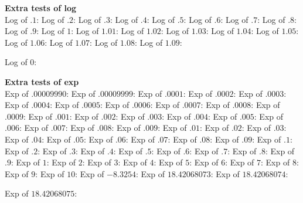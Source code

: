 \filbreak
{\bf Extra tests of log}\\
 Log of $.1$:\Z\w
 Log of $.2$:\Z\w
 Log of $.3$:\Z\w
 Log of $.4$:\Z\w
 Log of $.5$:\Z\w
 Log of $.6$:\Z\w
 Log of $.7$:\Z\w
 Log of $.8$:\Z\w
 Log of $.9$:\Z\w
  Log of $1$:\Z\w
Log of $1.01$:\Z\w
Log of $1.02$:\Z\w
Log of $1.03$:\Z\w
Log of $1.04$:\Z\w
Log of $1.05$:\Z\w
Log of $1.06$:\Z\w
Log of $1.07$:\Z\w
Log of $1.08$:\Z\w
Log of $1.09$:\Z\w
\immediate{}
Log of $0$:\Z\W

\filbreak
{\bf Extra tests of exp}\\
 Exp of $.00009990$:\Z
\w
 Exp of $.00009999$:\Z\w
  Exp of $.0001$:\Z\w
  Exp of $.0002$:\Z\w
  Exp of $.0003$:\Z\w
  Exp of $.0004$:\Z\w
  Exp of $.0005$:\Z\w
  Exp of $.0006$:\Z\w
  Exp of $.0007$:\Z\w
  Exp of $.0008$:\Z\w
  Exp of $.0009$:\Z\w
   Exp of $.001$:\Z\w
   Exp of $.002$:\Z\w
   Exp of $.003$:\Z\w
   Exp of $.004$:\Z\w
   Exp of $.005$:\Z\w
   Exp of $.006$:\Z\w
   Exp of $.007$:\Z\w
   Exp of $.008$:\Z\w
   Exp of $.009$:\Z\w
    Exp of $.01$:\Z\w
    Exp of $.02$:\Z\w
    Exp of $.03$:\Z\w
    Exp of $.04$:\Z\w
    Exp of $.05$:\Z\w
    Exp of $.06$:\Z\w
    Exp of $.07$:\Z\w
    Exp of $.08$:\Z\w
    Exp of $.09$:\Z\w
     Exp of $.1$:\Z\w
     Exp of $.2$:\Z\w
     Exp of $.3$:\Z\w
     Exp of $.4$:\Z\w
     Exp of $.5$:\Z\w
     Exp of $.6$:\Z\w
     Exp of $.7$:\Z\w
     Exp of $.8$:\Z\w
     Exp of $.9$:\Z\w
      Exp of $1$:\Z\w
      Exp of $2$:\Z\w
      Exp of $3$:\Z\w
      Exp of $4$:\Z\w
      Exp of $5$:\Z\w
      Exp of $6$:\Z\w
      Exp of $7$:\Z\w
      Exp of $8$:\Z\w
      Exp of $9$:\Z\w
     Exp of $10$:\Z\w
     Exp of $-8.3254$:\Z\w
     Exp of $18.42068073$:\Z\w
     Exp of $18.42068074$:\Z\w
\immediate{}
     Exp of $18.42068075$:\Z\W

